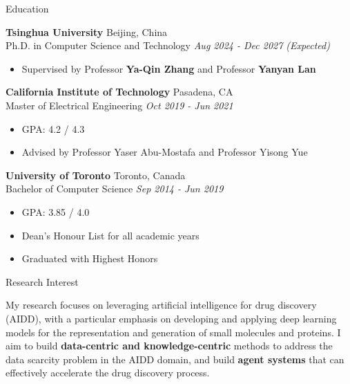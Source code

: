 \documentclass{resume} %
\begin{document}



\begin{rSection}{Education}

{\bf Tsinghua University} \hfill Beijing, China 
\\
Ph.D. in Computer Science and Technology \hfill {\em Aug 2024 - Dec 2027 (Expected)} 
 \begin{itemize}[leftmargin=1.5em, itemsep=2pt, parsep=0pt, topsep=3pt]
     \item Supervised by Professor \textbf{Ya-Qin Zhang} and Professor \textbf{Yanyan Lan}
 \end{itemize}

{\bf California Institute of Technology} \hfill Pasadena, CA
\\
Master of Electrical Engineering \hfill {\em Oct 2019 - Jun 2021}
 \begin{itemize}[leftmargin=1.5em, itemsep=2pt, parsep=0pt, topsep=3pt]
     \item GPA: 4.2 / 4.3
     \item Advised by Professor Yaser Abu-Mostafa and Professor Yisong Yue
 \end{itemize}

{\bf University of Toronto} \hfill Toronto, Canada
\\
Bachelor of Computer Science \hfill {\em Sep 2014 - Jun 2019}
 \begin{itemize}[leftmargin=1.5em, itemsep=2pt, parsep=0pt, topsep=3pt]
     \item GPA: 3.85 / 4.0
     \item Dean's Honour List for all academic years
     \item Graduated with Highest Honors
 \end{itemize}

\end{rSection}


\begin{rSection}{Research Interest}

My research focuses on leveraging artificial intelligence for drug discovery (AIDD), with a particular emphasis on developing and applying deep learning models for the representation and generation of small molecules and proteins. I aim to build \textbf{data-centric and knowledge-centric} methods to address the data scarcity problem in the AIDD domain, and build \textbf{agent systems} that can effectively accelerate the drug discovery process.
    
\end{rSection}
\end{document}
